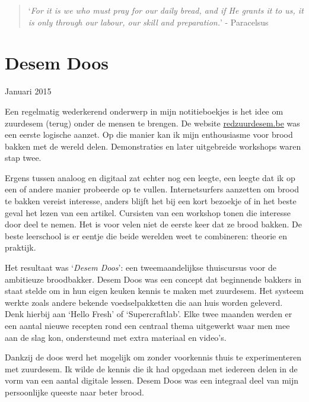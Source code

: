 \documentclass[
  11pt,
  dutch,
]{memoir}
\begin{document}
\begin{quote}
`\emph{For it is we who must pray for our daily bread, and if He grants
it to us, it is only through our labour, our skill and preparation.}' -
Paracelsus
\end{quote}

\label{desemdoos}

\hypertarget{desem-doos}{%
\section{Desem Doos}\label{desem-doos}}

\begin{flushright}
Januari 2015
\end{flushright}

Een regelmatig wederkerend onderwerp in mijn notitieboekjes is het idee
om zuurdesem (terug) onder de mensen te brengen. De website
\href{https://redzuurdesem.be/}{redzuurdesem.be} was een eerste logische
aanzet. Op die manier kan ik mijn enthousiasme voor brood bakken met de
wereld delen. Demonstraties en later uitgebreide workshops waren stap
twee.

Ergens tussen analoog en digitaal zat echter nog een leegte, een leegte
dat ik op een of andere manier probeerde op te vullen. Internetsurfers
aanzetten om brood te bakken vereist interesse, anders blijft het bij
een kort bezoekje of in het beste geval het lezen van een artikel.
Cursisten van een workshop tonen die interesse door deel te nemen. Het
is voor velen niet de eerste keer dat ze brood bakken. De beste
leerschool is er eentje die beide werelden weet te combineren: theorie
en praktijk.

Het resultaat was `\emph{Desem Doos}': een tweemaandelijkse thuiscursus
voor de ambitieuze broodbakker. Desem Doos was een concept dat
beginnende bakkers in staat stelde om in hun eigen keuken kennis te
maken met zuurdesem. Het systeem werkte zoals andere bekende
voedselpakketten die aan huis worden geleverd. Denk hierbij aan `Hello
Fresh' of `Supercraftlab'. Elke twee maanden werden er een aantal nieuwe
recepten rond een centraal thema uitgewerkt waar men mee aan de slag
kon, ondersteund met extra materiaal en video's.

Dankzij de doos werd het mogelijk om zonder voorkennis thuis te
experimenteren met zuurdesem. Ik wilde de kennis die ik had opgedaan met
iedereen delen in de vorm van een aantal digitale lessen. Desem Doos was
een integraal deel van mijn persoonlijke queeste naar beter brood.
\end{document}

